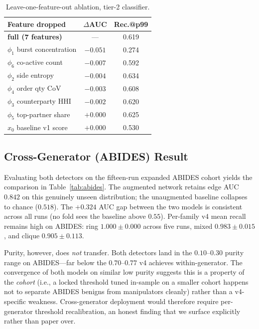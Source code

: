 \documentclass[10pt,twocolumn,letterpaper]{article}
\begin{document}
\begin{table}[t]
\caption{Leave-one-feature-out ablation, tier-2 classifier.}
\label{tab:abl}
\centering
\begin{tabular}{lcc}
\toprule
Feature dropped & $\Delta$AUC & Rec.@p99 \\
\midrule
\textbf{full (7 features)} & --- & 0.619 \\
$\phi_1$ burst concentration & $-0.051$ & 0.274 \\
$\phi_6$ co-active count & $-0.007$ & 0.592 \\
$\phi_2$ side entropy & $-0.004$ & 0.634 \\
$\phi_4$ order qty CoV & $-0.003$ & 0.608 \\
$\phi_3$ counterparty HHI & $-0.002$ & 0.620 \\
$\phi_5$ top-partner share & $+0.000$ & 0.625 \\
$x_0$ baseline v1 score & $+0.000$ & 0.530 \\
\bottomrule
\end{tabular}
\end{table}

\subsection{Cross-Generator (ABIDES) Result}
\label{sec:abides}
Evaluating both detectors on the fifteen-run expanded ABIDES cohort
yields the comparison in Table~\ref{tab:abides}. The augmented network
retains edge AUC \(0.842\) on this genuinely unseen distribution; the
unaugmented baseline collapses to chance (\(0.518\)). The
\(+0.324\) AUC gap between the two models is consistent across all
runs (no fold sees the baseline above \(0.55\)). Per-family v4 mean
recall remains high on ABIDES: ring \(1.000\pm0.000\) across five
runs, mixed \(0.983\pm0.015\), and clique \(0.905\pm0.113\).

Purity, however, does \emph{not} transfer. Both detectors land in the
\(0.10\)--\(0.30\) purity range on ABIDES---far below the
\(0.70\)--\(0.77\) v4 achieves within-generator. The convergence of
both models on similar low purity suggests this is a property of the
\emph{cohort} (i.e., a locked threshold tuned in-sample on a smaller
cohort happens not to separate ABIDES benigns from manipulators
cleanly) rather than a v4-specific weakness. Cross-generator
deployment would therefore require per-generator threshold
recalibration, an honest finding that we surface explicitly rather
than paper over.
\end{document}

